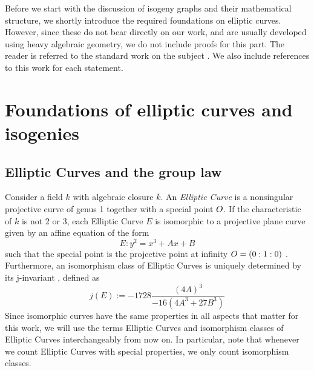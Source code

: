 
Before we start with the discussion of isogeny graphs and their mathematical structure, we shortly introduce the required foundations on elliptic curves.
However, since these do not bear directly on our work, and are usually developed using heavy algebraic geometry, we do not include proofs for this part.
The reader is referred to the standard work on the subject \cite{arithmetic_elliptic_curves}.
We also include references to this work for each statement.

\section{Foundations of elliptic curves and isogenies}

\subsection{Elliptic Curves and the group law}
Consider a field $k$ with algebraic closure $\bar{k}$.
An \emph{Elliptic Curve} is a nonsingular projective curve of genus 1 together with a special point $O$.
If the characteristic of $k$ is not 2 or 3, each Elliptic Curve $E$ is isomorphic to a projective plane curve given by an affine equation of the form
\begin{equation*}
    E: y^2 = x^3 + Ax + B
\end{equation*}
such that the special point is the projective point at infinity $O = (0 : 1 : 0)$ \cite[Prop.~III.3.1]{arithmetic_elliptic_curves}.
Furthermore, an isomorphism class of Elliptic Curves is uniquely determined by its j-invariant \cite[Prop.~III.1.4]{arithmetic_elliptic_curves}, defined as
\begin{equation*}
    j(E) := -1728 \frac {(4A)^3} {-16(4A^3 + 27B^3)}
\end{equation*}
Since isomorphic curves have the same properties in all aspects that matter for this work, we will use the terms Elliptic Curves and isomorphism classes of Elliptic Curves interchangeably from now on.
In particular, note that whenever we count Elliptic Curves with special properties, we only count isomorphism classes. 

